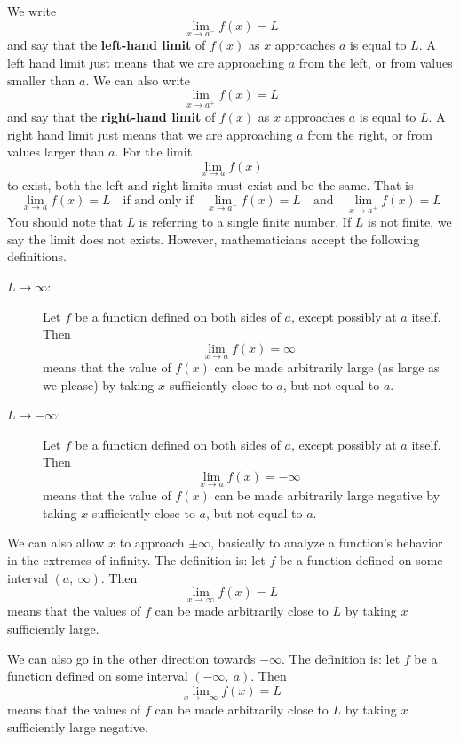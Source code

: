 \documentclass[12pt,addpoints, answers, fleqn]{exam}
\begin{document}
We write
\[
\mathop {\lim }\limits_{x \to a^- }  f \left( x \right) = L
\]
and say that the \textbf{left-hand limit} of $f \left( x \right)$ as $x$ approaches $a$ is equal to $L$. A left hand limit just means that we are approaching $a$ from the left, or from values smaller than $a$. We can also write
\[
\mathop {\lim }\limits_{x \to a^+ }  f \left( x \right) = L
\]
and say that the \textbf{right-hand limit} of $f \left( x \right)$ as $x$ approaches $a$ is equal to $L$. A right hand limit just means that we are approaching $a$ from the right, or from values larger than $a$. For the limit
\[
\mathop {\lim }\limits_{x \to a }  f \left( x \right)
\]
to exist, both the left and right limits must exist and be the same. That is
\[
\mathop {\lim }\limits_{x \to a }  f \left( x \right) = L \quad \mbox{if and only if} \quad \mathop {\lim }\limits_{x \to a^- }  f \left( x \right) = L \quad \mbox{and} \quad \mathop {\lim }\limits_{x \to a^+ }  f \left( x \right) = L
\]
You should note that $L$ is referring to a single finite number. If $L$ is not finite, we say the limit does not exists. However,  mathematicians accept the following definitions.
\begin{description}
\item[$L \rightarrow \infty$:] Let $f$ be a function defined on both sides of $a$, except possibly at $a$ itself. Then
\[
\mathop {\lim }\limits_{x \to a }  f \left( x \right) = \infty
\]
means that the value of $f\left(x\right)$ can be made arbitrarily large (as large as we please) by taking $x$ sufficiently close to $a$, but not equal to $a$.
\item[$L \rightarrow  -\infty$:] Let $f$ be a function defined on both sides of $a$, except possibly at $a$ itself. Then
\[
\mathop {\lim }\limits_{x \to a }  f \left( x \right) = -\infty
\]
means that the value of $f\left(x\right)$ can be made arbitrarily large negative by taking $x$ sufficiently close to $a$, but not equal to $a$.
\end{description}



We can also allow $x$ to approach $\pm \infty$, basically to analyze a function's behavior in the extremes of infinity. The definition is: let $f$ be a function defined on some interval $\left( a, \ \infty \right)$. Then
\[
\mathop {\lim }\limits_{x \to \infty }  f \left( x \right) = L
\]
means that the values of $f$ can be made arbitrarily close to $L$ by taking $x$ sufficiently large.



We can also go in the other direction towards $-\infty$. The definition is: let $f$ be a function defined on some interval $\left( -\infty, \ a \right)$. Then
\[
\mathop {\lim }\limits_{x \to -\infty }  f \left( x \right) = L
\]
means that the values of $f$ can be made arbitrarily close to $L$ by taking $x$ sufficiently large negative.
\end{document}
